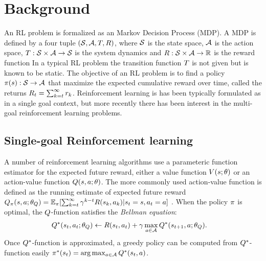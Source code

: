 \section{Background}

An RL problem is formalized as an Markov Decision Process (MDP). A MDP is
defined by a four tuple $(\mathcal{S}, \mathcal{A}, T, R)$, where $\mathcal{S}$ is the
state space, $\mathcal{A}$ is the action space, $T : \mathcal{S} \times \mathcal{A}
\rightarrow \mathcal{S}$ is the system dynamics and $R : \mathcal{S} \times \mathcal{A}
\rightarrow \mathbb{R} $ is the reward function
In a typical RL problem the transition function $T$ is not given but is
known to be static.
The objective of an RL problem is to find a policy $\pi(s): \mathcal{S}
\rightarrow \mathcal{A}$ that
maximize the expected cumulative
reward over time, called the returns  $R_t = \sum_{k=t}^{\infty} r_{k}$.
Reinforcement learning is has been typically formulated as in a single goal
context, but more recently there has been interest in the multi-goal
reinforcement learning problems.


\subsection{Single-goal Reinforcement learning}

A number of reinforcement learning algorithms use a parameteric function
estimator for the expected future reward, either a value function
$V(s; \theta)$ or an action-value function $Q(s, a; \theta)$.
The more commonly used action-value function is defined as the running estimate
of expected future reward
%
$Q_\pi(s, a; \theta_Q) = \mathbb{E}_\pi[ \sum_{k=t}^\infty
\gamma^{k-t} R(s_k, a_k) | s_t = s, a_t = a ]$ .
%
When the policy $\pi$ is optimal, the $Q$-function satisfies the
\emph{Bellman equation}:
%
\begin{align}
Q^*(s_t, a_t; \theta_Q) &\leftarrow R(s_t, a_t) + \gamma \max_{a \in \mathcal{A}} Q^*(s_{t+1}, a; \theta_Q).
                                    \label{eq:bellman}
\end{align}%
% 
Once $Q^*$-function is approximated, a greedy policy can be computed from $Q^*$-function easily $\pi^*(s_t) = \arg \max_{a \in \mathcal{A}} Q^*(s_t, a)$.

